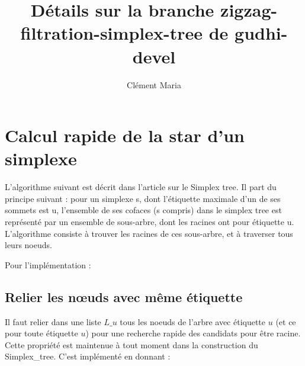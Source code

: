 \documentclass[11pt]{amsart}
\title{Détails sur la branche zigzag-filtration-simplex-tree de gudhi-devel}
\author{Cl\'ement Maria}
\numberwithin{equation}{section}
\theoremstyle{plain}
\theoremstyle{definition}
\begin{document}
\maketitle









\section{Calcul rapide de la star d'un simplexe}

L'algorithme suivant est décrit dans l'article sur le Simplex tree. Il part du principe suivant : pour un simplexe s, dont l'étiquette maximale d'un de ses sommets est u, l'ensemble de ses cofaces (s compris) dans le simplex tree est représenté par un ensemble de sous-arbre, dont les racines ont pour étiquette u. L'algorithme consiste à trouver les racines de ces sous-arbre, et à traverser tous leurs noeuds.

Pour l'implémentation :


\subsection{Relier les n\oe uds avec même étiquette}

Il faut relier dans une liste $L\_u$ tous les noeuds de l'arbre avec étiquette $u$ (et ce pour toute étiquette $u$) pour une recherche rapide des candidats pour être racine. Cette propriété est maintenue à tout moment dans la construction du Simplex\_tree. C'est implémenté en donnant :
\end{document}
